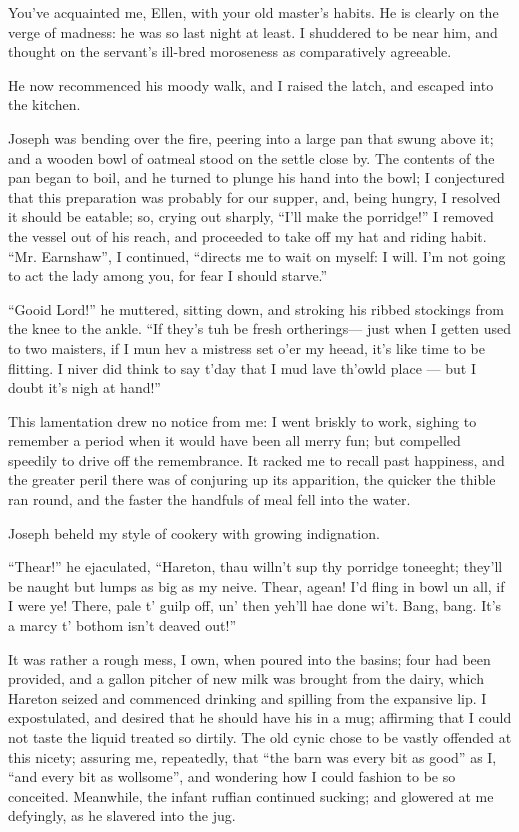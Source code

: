 \par You've acquainted me, Ellen, with your old master's habits. He is clearly on the verge of madness: he was so last night at least. I shuddered to be near him, and thought on the servant's ill-bred moroseness as comparatively agreeable.
\par He now recommenced his moody walk, and I raised the latch, and escaped into the kitchen.
\par Joseph was bending over the fire, peering into a large pan that swung above it; and a wooden bowl of oatmeal stood on the settle close by. The contents of the pan began to boil, and he turned to plunge his hand into the bowl; I conjectured that this preparation was probably for our supper, and, being hungry, I resolved it should be eatable; so, crying out sharply, “I'll make the porridge!” I removed the vessel out of his reach, and proceeded to take off my hat and riding habit. “Mr. Earnshaw”, I continued, “directs me to wait on myself: I will. I'm not going to act the lady among you, for fear I should starve.”
\par “Gooid Lord!” he muttered, sitting down, and stroking his ribbed stockings from the knee to the ankle. “If they's tuh be fresh ortherings— just when I getten used to two maisters, if I mun hev a mistress set o'er my heead, it's like time to be flitting. I niver did think to say t'day that I mud lave th'owld place — but I doubt it's nigh at hand!”
\par This lamentation drew no notice from me: I went briskly to work, sighing to remember a period when it would have been all merry fun; but compelled speedily to drive off the remembrance. It racked me to recall past happiness, and the greater peril there was of conjuring up its apparition, the quicker the thible ran round, and the faster the handfuls of meal fell into the water.
\par Joseph beheld my style of cookery with growing indignation.
\par “Thear!” he ejaculated, “Hareton, thau willn't sup thy porridge toneeght; they'll be naught but lumps as big as my neive. Thear, agean! I'd fling in bowl un all, if I were ye! There, pale t' guilp off, un' then yeh'll hae done wi't. Bang, bang. It's a marcy t' bothom isn't deaved out!”
\par It was rather a rough mess, I own, when poured into the basins; four had been provided, and a gallon pitcher of new milk was brought from the dairy, which Hareton seized and commenced drinking and spilling from the expansive lip. I expostulated, and desired that he should have his in a mug; affirming that I could not taste the liquid treated so dirtily. The old cynic chose to be vastly offended at this nicety; assuring me, repeatedly, that “the barn was every bit as good” as I, “and every bit as wollsome”, and wondering how I could fashion to be so conceited. Meanwhile, the infant ruffian continued sucking; and glowered at me defyingly, as he slavered into the jug.
